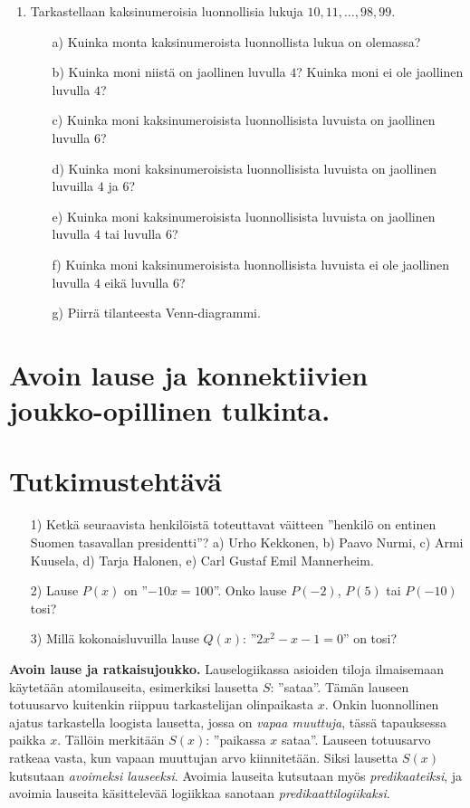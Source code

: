 \begin{enumerate}
\item Tarkastellaan kaksinumeroisia luonnollisia lukuja $10,11, \ldots ,98,99$.
\begin{itemize}
\item[a)] Kuinka monta kaksinumeroista luonnollista lukua on olemassa?
\item[b)] Kuinka moni niistä on jaollinen luvulla $4$? Kuinka moni ei ole jaollinen luvulla $4$?
\item[c)] Kuinka moni kaksinumeroisista luonnollisista luvuista on jaollinen luvulla $6$?
\item[d)] Kuinka moni kaksinumeroisista luonnollisista luvuista on jaollinen luvuilla $4$ ja $6$?
\item[e)] Kuinka moni kaksinumeroisista luonnollisista luvuista on jaollinen luvulla $4$ tai luvulla $6$?
\item[f)] Kuinka moni kaksinumeroisista luonnollisista luvuista ei ole jaollinen luvulla $4$ eikä luvulla $6$?
\item[g)] Piirrä tilanteesta Venn-diagrammi.
\end{itemize}

\end{enumerate}

\newpage


\section{Avoin lause ja konnektiivien joukko-opillinen tulkinta.}

\section*{Tutkimustehtävä}
\begin{itemize}
\item[1)] Ketkä seuraavista henkilöistä toteuttavat väitteen ''henkilö on entinen Suomen tasavallan presidentti''? 
a) Urho Kekkonen,  b)  Paavo Nurmi,  c)  Armi Kuusela,  d)  Tarja Halonen,  
e) Carl Gustaf Emil Mannerheim.
\item[2)] 
Lause $P(x)$ on ''$-10x = 100$''. Onko lause $P(-2)$, $P(5)$ tai $P(-10)$ tosi?
\item[3)] 
Millä kokonaisluvuilla lause $Q(x)$: ''$2x^2 - x - 1 = 0$'' on tosi?
\end{itemize}

{\bf Avoin lause ja ratkaisujoukko.}
Lauselogiikassa asioiden tiloja ilmaisemaan käytetään atomilauseita, esimerkiksi lausetta $S$: ''sataa''. Tämän lauseen totuusarvo kuitenkin riippuu tarkastelijan olinpaikasta $x$. Onkin luonnollinen ajatus tarkastella loogista lausetta, jossa on {\em vapaa muuttuja}, tässä tapauksessa paikka $x$. Tällöin merkitään $S(x)$: ''paikassa $x$ sataa''. Lauseen totuusarvo ratkeaa vasta, kun vapaan muuttujan arvo kiinnitetään. Siksi lausetta $S(x)$ kutsutaan {\em avoimeksi lauseeksi}. Avoimia lauseita kutsutaan myös {\em predikaateiksi}, ja avoimia lauseita käsittelevää logiikkaa sanotaan {\em predikaattilogiikaksi}.

